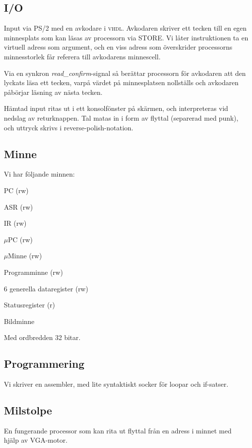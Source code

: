 \documentclass[]{article}
\begin{document}
\subsection{I/O}
Input via PS/2 med en avkodare i \textsc{vhdl}. Avkodaren skriver ett tecken till en egen minnesplats som kan läsas av processorn via STORE. Vi låter instruktionen ta en virtuell adress som argument, och en viss adress som överskrider processorns minnesstorlek får referera till avkodarens minnescell.

Via en synkron \textit{read\_confirm}-signal så berättar processorn för avkodaren att den lyckats läsa ett tecken, varpå värdet på minnesplatsen nollställs och avkodaren påbörjar läsning av nästa tecken.

Hämtad input ritas ut i ett konsolfönster på skärmen, och interpreteras vid nedslag av returknappen. Tal matas in i form av flyttal (separerad med punk), och uttryck skrivs i reverse-polish-notation.


\subsection{Minne}
Vi har följande minnen:
\begin{itemize*}
\item PC (rw)
\item ASR (rw)
\item IR (rw)
\item $\mu$PC (rw)
\item $\mu$Minne (rw)
\item Programminne (rw)
\item 6 generella dataregister (rw)
\item Statusregister (r)
\item Bildminne
\end{itemize*}
Med ordbredden 32 bitar.

\subsection{Programmering}
Vi skriver en assembler, med lite syntaktiskt socker för loopar och if-satser.

\subsection{Milstolpe}
En fungerande processor som kan rita ut flyttal från en adress i minnet med hjälp av VGA-motor.
\end{document}
